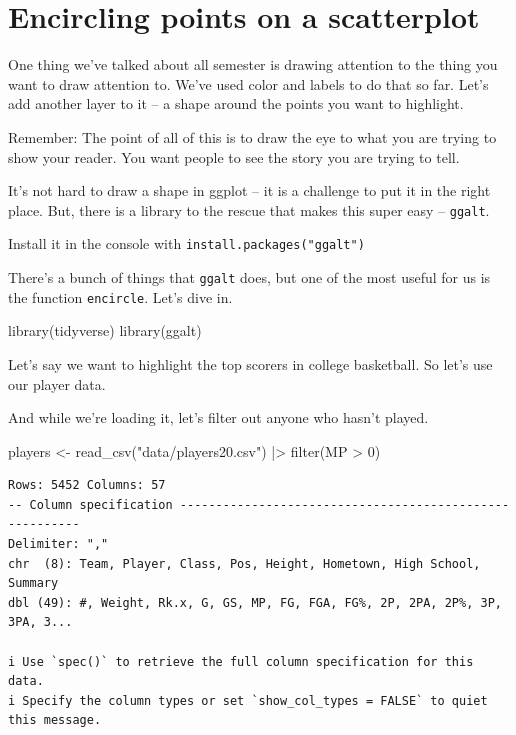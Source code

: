 \documentclass[
  letterpaper,
  DIV=11,
  numbers=noendperiod]{scrreprt}
\newenvironment{Shaded}{\begin{snugshade}}{\end{snugshade}}
\newcommand{\DecValTok}[1]{\textcolor[rgb]{0.68,0.00,0.00}{#1}}
\newcommand{\FunctionTok}[1]{\textcolor[rgb]{0.28,0.35,0.67}{#1}}
\newcommand{\NormalTok}[1]{\textcolor[rgb]{0.00,0.23,0.31}{#1}}
\newcommand{\OtherTok}[1]{\textcolor[rgb]{0.00,0.23,0.31}{#1}}
\newcommand{\SpecialCharTok}[1]{\textcolor[rgb]{0.37,0.37,0.37}{#1}}
\newcommand{\StringTok}[1]{\textcolor[rgb]{0.13,0.47,0.30}{#1}}
\begin{document}

\hypertarget{encircling-points-on-a-scatterplot}{%
\chapter{Encircling points on a
scatterplot}\label{encircling-points-on-a-scatterplot}}

One thing we've talked about all semester is drawing attention to the
thing you want to draw attention to. We've used color and labels to do
that so far. Let's add another layer to it -- a shape around the points
you want to highlight.

Remember: The point of all of this is to draw the eye to what you are
trying to show your reader. You want people to see the story you are
trying to tell.

It's not hard to draw a shape in ggplot -- it is a challenge to put it
in the right place. But, there is a library to the rescue that makes
this super easy -- \texttt{ggalt}.

Install it in the console with \texttt{install.packages("ggalt")}

There's a bunch of things that \texttt{ggalt} does, but one of the most
useful for us is the function \texttt{encircle}. Let's dive in.

\begin{Shaded}
\begin{Highlighting}[]
\FunctionTok{library}\NormalTok{(tidyverse)}
\FunctionTok{library}\NormalTok{(ggalt)}
\end{Highlighting}
\end{Shaded}

Let's say we want to highlight the top scorers in college basketball. So
let's use our player data.

And while we're loading it, let's filter out anyone who hasn't played.

\begin{Shaded}
\begin{Highlighting}[]
\NormalTok{players }\OtherTok{\textless{}{-}} \FunctionTok{read\_csv}\NormalTok{(}\StringTok{"data/players20.csv"}\NormalTok{) }\SpecialCharTok{|\textgreater{}} \FunctionTok{filter}\NormalTok{(MP }\SpecialCharTok{\textgreater{}} \DecValTok{0}\NormalTok{)}
\end{Highlighting}
\end{Shaded}

\begin{verbatim}
Rows: 5452 Columns: 57
-- Column specification --------------------------------------------------------
Delimiter: ","
chr  (8): Team, Player, Class, Pos, Height, Hometown, High School, Summary
dbl (49): #, Weight, Rk.x, G, GS, MP, FG, FGA, FG%, 2P, 2PA, 2P%, 3P, 3PA, 3...

i Use `spec()` to retrieve the full column specification for this data.
i Specify the column types or set `show_col_types = FALSE` to quiet this message.
\end{verbatim}
\end{document}

